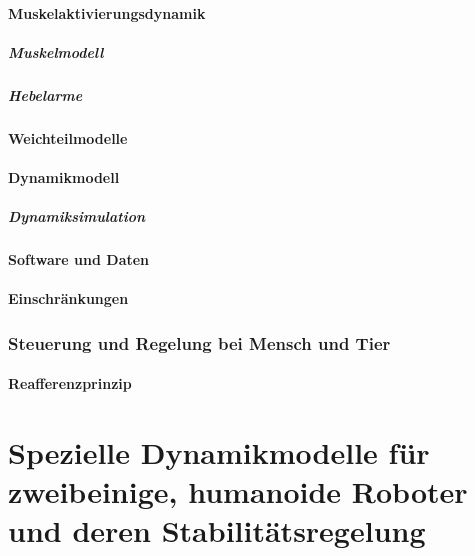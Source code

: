 \documentclass[a4paper, 11pt, accentcolor = tud3b]{tudreport}
\begin{document}
					\paragraph{Muskelaktivierungsdynamik} %

						\subparagraph{Muskelmodell} %

						\subparagraph{Hebelarme} %

					\paragraph{Weichteilmodelle} %

					\paragraph{Dynamikmodell} %

						\subparagraph{Dynamiksimulation} %

					\paragraph{Software und Daten} %

					\paragraph{Einschränkungen} %

				\subsubsection{Steuerung und Regelung bei Mensch und Tier} %

					\paragraph{Reafferenzprinzip} %

		\section{Spezielle Dynamikmodelle für zweibeinige, humanoide Roboter und deren Stabilitätsregelung} %
\end{document}
